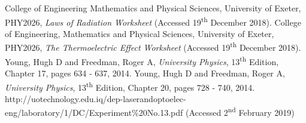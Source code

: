 \documentclass{article}
\begin{document}
\begin{thebibliography}{9}
 College of Engineering Mathematics and Physical Sciences, University of Exeter, PHY2026, \textit{Laws of Radiation Worksheet} (Accessed 19\textsuperscript{th} December 2018).
 College of Engineering, Mathematics and Physical Sciences, University of Exeter, PHY2026, \textit{The Thermoelectric Effect Worksheet} (Accessed 19\textsuperscript{th} December 2018).
 Young, Hugh D and Freedman, Roger A, \textit{University Physics}, 13\textsuperscript{th} Edition, Chapter 17, pages 634 - 637, 2014.
 Young, Hugh D and Freedman, Roger A, \textit{University Physics}, 13\textsuperscript{th} Edition, Chapter 20, pages 728 - 740, 2014.
 http://uotechnology.edu.iq/dep-laserandoptoelec-eng/laboratory/1/DC/Experiment\%20No.13.pdf (Accessed 2\textsuperscript{nd} February 2019)
\end{thebibliography}
\end{document}

